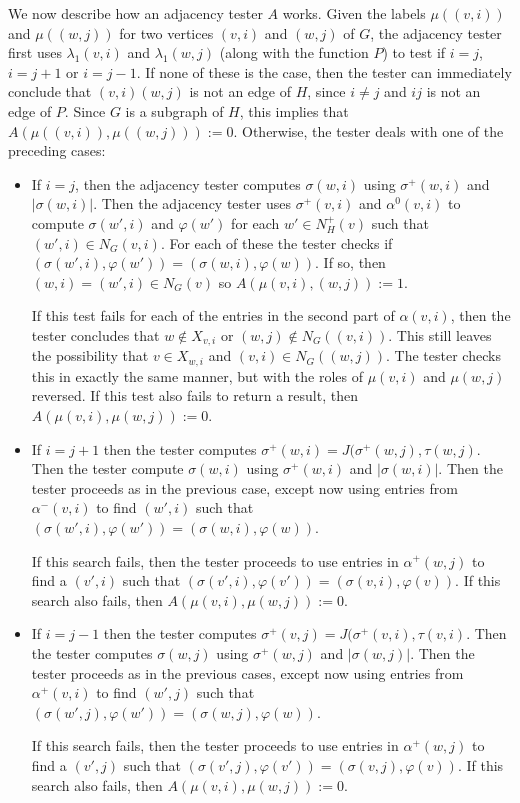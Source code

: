 \documentclass{patmorin}
\begin{document}
  We now describe how an adjacency tester $A$ works.
  Given the labels $\mu((v,i))$ and $\mu((w,j))$ for two vertices $(v,i)$ and $(w,j)$ of $G$, the adjacency tester first uses $\lambda_1(v,i)$ and $\lambda_1(w,j)$ (along with the function $P$) to test if $i=j$, $i=j+1$ or $i=j-1$.  If none of these is the case, then the tester can immediately conclude that $(v,i)(w,j)$ is not an edge of $H$, since $i\neq j$ and $ij$ is not an edge of $P$.  Since $G$ is a subgraph of $H$, this implies that $A(\mu((v,i)),\mu((w,j))):=0$.  Otherwise, the tester deals with one of the preceding cases:
  \begin{itemize}
    \item If $i=j$, then the adjacency tester computes $\sigma(w,i)$ using $\sigma^+(w,i)$ and $|\sigma(w,i)|$.  Then the adjacency tester uses $\sigma^+(v,i)$ and $\alpha^0(v,i)$ to compute $\sigma(w',i)$ and $\varphi(w')$ for each $w'\in N^+_H(v)$ such that $(w',i)\in N_G(v,i)$.  For each of these the tester checks if $(\sigma(w',i),\varphi(w'))=(\sigma(w,i),\varphi(w))$. If so, then $(w,i)=(w',i)\in N_G(v)$ so $A(\mu(v,i),(w,j)):=1$.

    If this test fails for each of the entries in the second part of $\alpha(v,i)$, then the tester concludes that $w\not\in X_{v,i}$ or $(w,j)\not\in N_G((v,i))$.  This still leaves the possibility that $v\in X_{w,i}$ and $(v,i)\in N_G((w,j))$.  The tester checks this in exactly the same manner, but with the roles of $\mu(v,i)$ and $\mu(w,j)$ reversed.  If this test also fails to return a result, then $A(\mu(v,i),\mu(w,j)):=0$.

    \item If $i=j+1$ then the tester computes $\sigma^+(w,i)=J(\sigma^+(w,j),\tau(w,j)$. Then the tester compute $\sigma(w,i)$ using $\sigma^+(w,i)$ and $|\sigma(w,i)|$.
    Then the tester proceeds as in the previous case, except now using entries from $\alpha^-(v,i)$ to find $(w',i)$ such that $(\sigma(w',i),\varphi(w'))=(\sigma(w,i),\varphi(w))$.

    If this search fails, then the tester proceeds to use entries in $\alpha^+(w,j)$ to find a $(v',i)$ such that $(\sigma(v',i),\varphi(v'))=(\sigma(v,i),\varphi(v))$.  If this search also fails, then $A(\mu(v,i),\mu(w,j)):=0$.

    \item If $i=j-1$ then the tester computes $\sigma^+(v,j)=J(\sigma^+(v,i),\tau(v,i)$. Then the tester computes $\sigma(w,j)$ using $\sigma^+(w,j)$ and $|\sigma(w,j)|$.
    Then the tester proceeds as in the previous cases, except now using entries from $\alpha^+(v,i)$ to find $(w',j)$ such that $(\sigma(w',j),\varphi(w'))=(\sigma(w,j),\varphi(w))$.

    If this search fails, then the tester proceeds to use entries in $\alpha^+(w,j)$ to find a $(v',j)$ such that $(\sigma(v',j),\varphi(v'))=(\sigma(v,j),\varphi(v))$.  If this search also fails, then $A(\mu(v,i),\mu(w,j)):=0$.
  \end{itemize}
\end{document}
